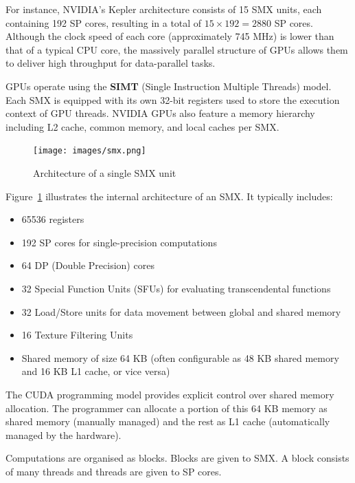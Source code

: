 \documentclass[12pt]{book}
\begin{document}
For instance, NVIDIA's Kepler architecture consists of 15 SMX units, each containing 192 SP cores, resulting in a total of $15 \times 192 = 2880$ SP cores. Although the clock speed of each core (approximately 745 MHz) is lower than that of a typical CPU core, the massively parallel structure of GPUs allows them to deliver high throughput for data-parallel tasks.

GPUs operate using the \textbf{SIMT} (Single Instruction Multiple Threads) model. Each SMX is equipped with its own 32-bit registers used to store the execution context of GPU threads. NVIDIA GPUs also feature a memory hierarchy including L2 cache, common memory, and local caches per SMX.

\begin{figure}[H]
    \centering
    \texttt{[image: images/smx.png]}
    \caption{Architecture of a single SMX unit}
    \label{fig:smx}
\end{figure}

Figure~\ref{fig:smx} illustrates the internal architecture of an SMX. It typically includes:
\begin{itemize}
    \item 65536 registers
    \item 192 SP cores for single-precision computations
    \item 64 DP (Double Precision) cores
    \item 32 Special Function Units (SFUs) for evaluating transcendental functions
    \item 32 Load/Store units for data movement between global and shared memory
    \item 16 Texture Filtering Units
    \item Shared memory of size 64 KB (often configurable as 48 KB shared memory and 16 KB L1 cache, or vice versa)
\end{itemize}

The CUDA programming model provides explicit control over shared memory allocation. The programmer can allocate a portion of this 64 KB memory as shared memory (manually managed) and the rest as L1 cache (automatically managed by the hardware).

Computations are organised as blocks. Blocks are given to SMX. A block consists of many threads and threads are given to SP cores.
\end{document}
